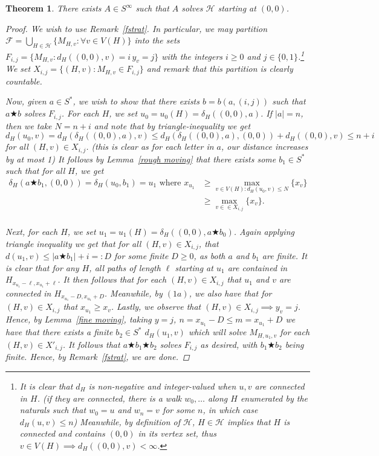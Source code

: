 \documentclass[a4paper]{article}
\newtheorem{thm}{Theorem}
\theoremstyle{definition}
\begin{document}
\begin{thm} There exists $A \in S^\infty$ such that $A$ solves $\mathcal{H}$ starting at $(0,0)$.
\begin{proof}
    We wish to use Remark~\ref{fstrat}. In particular, we may partition $\mathcal{F} = \bigcup_{H \in \mathcal{H}}\{M_{H,v}:\forall v \in V(H)\}$ into the sets $F_{i,j} = \{M_{H,v}: d_H((0,0),v) = i\,y_v = j\}$ with the integers $i \ge 0$ and $j \in \{0,1\}$.\footnote{It is clear that $d_H$ is non-negative and integer-valued when $u,v$ are connected in $H$. (if they are connected, there is a walk $w_0,\dots$ along $H$ enumerated by the naturals such that $w_0 = u$ and $w_n = v$ for some $n$, in which case $d_H(u,v) \le n$) Meanwhile, by definition of $\mathcal{H}$, $H \in \mathcal{H}$ implies that $H$ is connected and contains $(0,0)$ in its vertex set, thus $v \in V(H) \implies d_H((0,0),v)<\infty$.} We set $X_{i,j} = \{(H,v): M_{H,v} \in F_{i,j}\}$ and remark that this partition is clearly countable.
    
    Now, given $a \in S^*$, we wish to show that there exists $b=b(a,(i,j))$ such that $a\bigstar b$ solves $F_{i,j}$. For each $H$, we set $u_0= u_0(H) = \delta_H((0,0),a)$. If $|a| = n$, then we take $N = n+i$ and note that by triangle-inequality we get \[d_H(u_0,v) =d_H(\delta_H((0,0),a),v)\le d_H(\delta_H((0,0),a),(0,0)) + d_H((0,0),v) \le n +i \]for all $(H,v) \in X_{i,j}$. (this is clear as for each letter in $a$, our distance increases by at most 1) It follows by Lemma~\ref{rough moving} that there exists some $b_1 \in S^*$ such that for all $H$, we get \begin{align*}
        \delta_H(a\bigstar b_1,(0,0)) = \delta_H(u_0,b_1) = u_1\textrm{ where }x_{u_1} &\ge \max_{v\in V(H): d_H(u_0,v)\le N}\{x_v\} \\&\ge  \max_{v\in \in X_{i,j}} \{x_v\}.\tag{1a}\\
    \end{align*}
    
    Next, for each $H$, we set $u_1 = u_1(H) =\delta_H((0,0),a\bigstar b_0)$. Again applying triangle inequality we get that for all $(H,v) \in X_{i,j}$, that $d(u_1,v) \le |a\bigstar b_1| +i =: D$ for some finite $D\ge 0$, as both $a$ and $b_1$ are finite. It is clear that for any $H$, all paths of length $\ell$ starting at $u_1$ are contained in $H_{x_{u_1}-\ell,x_{u_1}+\ell}$. It then follows that for each $(H,v) \in X_{i,j}$ that $u_1$ and $v$ are connected in $H_{x_{u_1}-D,x_{u_1}+D}$. Meanwhile, by $(1a)$, we also have that for $(H,v) \in X_{i,j}$ that $x_{u_1} \ge x_v$. Lastly, we observe that $(H,v) \in X_{i,j} \implies y_v = j$. 
    Hence, by Lemma~\ref{fine moving}, taking $y = j$, $n = x_{u_1}-D\le m = x_{u_1}+D$ we have that there exists a finite $b_2 \in S^*$ $d_H(u_1,v)$ which will solve $M_{H,u_1,v}$ for each $(H,v) \in X'_{i,j}$. It follows that $a \bigstar b_1\bigstar b_2$ solves $F_{i,j}$ as desired, with $b_1\bigstar b_2$ being finite. Hence, by Remark~\ref{fstrat}, we are done.
\end{proof}
\end{thm}
\end{document}
